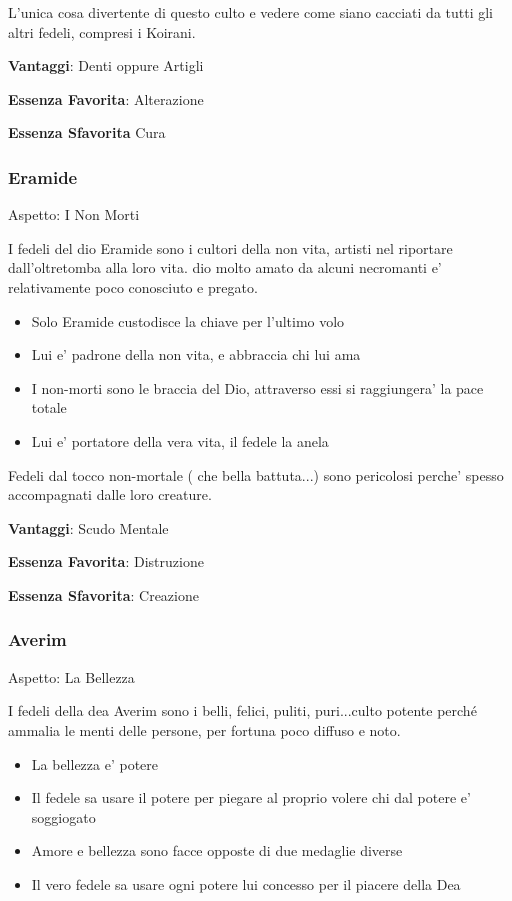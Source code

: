 \documentclass[a4paper,11pt,twoside,openany]{book}
\begin{document}
L'unica cosa divertente di questo culto e vedere come siano cacciati da tutti gli altri fedeli, compresi i Koirani.


\textbf{Vantaggi}: Denti oppure Artigli

\textbf{Essenza Favorita}: Alterazione

\textbf{Essenza Sfavorita} Cura
\bigskip

\subsubsection{Eramide}

Aspetto: I Non Morti
\bigskip

I fedeli del dio Eramide sono i cultori della non vita, artisti nel riportare dall'oltretomba alla loro vita. dio molto amato da alcuni necromanti e' relativamente poco conosciuto e pregato.


\begin{itemize}
	\item Solo Eramide custodisce la chiave per l'ultimo volo
	\item Lui e' padrone della non vita, e abbraccia chi lui ama
	\item I non-morti sono le braccia del Dio, attraverso essi si raggiungera' la pace totale
	\item Lui e' portatore della vera vita, il fedele la anela
\end{itemize}

Fedeli dal tocco non-mortale ( che bella battuta...) sono pericolosi perche' spesso accompagnati dalle loro creature. 


\textbf{Vantaggi}: Scudo Mentale

\textbf{Essenza Favorita}: Distruzione

\textbf{Essenza Sfavorita}: Creazione
\bigskip

\subsubsection{Averim}

Aspetto: La Bellezza
\bigskip


I fedeli della dea Averim sono i belli, felici, puliti, puri...culto potente perché ammalia le menti delle persone, per fortuna poco diffuso e noto.

\begin{itemize}
	\item La bellezza e' potere
	\item Il fedele sa usare il potere per piegare al proprio volere chi dal potere e' soggiogato
	\item Amore e bellezza sono facce opposte di due medaglie diverse
	\item Il vero fedele sa usare ogni potere lui concesso per il piacere della Dea
\end{itemize}
\end{document}
